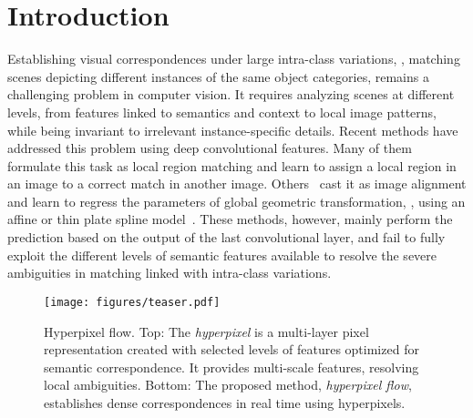 \documentclass[10pt,twocolumn,letterpaper]{article}
\begin{document}
\section{Introduction}
Establishing visual correspondences under large intra-class variations, \ie, matching scenes depicting different instances of the same object categories, remains a challenging problem in computer vision. It requires analyzing scenes at different levels, from features linked to semantics and context to local image patterns, while being invariant to irrelevant instance-specific details.
Recent methods have addressed this problem using deep convolutional features. 
Many of them~\cite{choy2016universal,han2017scnet,kim2017fcss,Rocco18} formulate this task as local region matching and learn to assign a local region in an image to a correct match in another image. Others~\cite{NIPS2018_7851, Rocco17, Rocco18, paul2018attentive} cast it as image alignment and learn to regress the parameters of global geometric transformation, \eg, using an affine or thin plate spline model~\cite{donato2002approximate}. These methods, however, mainly perform the prediction based on the output of the last convolutional layer, and fail to fully exploit the different levels of semantic features available to resolve the severe ambiguities in matching linked with intra-class variations.  


\begin{figure}[t]
	
    \centering
    \texttt{[image: figures/teaser.pdf]}
	\vspace{-3.0mm}
		
	\caption{Hyperpixel flow. {Top:} The {\em hyperpixel} is a multi-layer pixel representation created with selected levels of features optimized for semantic correspondence. It provides multi-scale features, resolving local ambiguities. {Bottom:} The proposed method, {\em hyperpixel flow}, establishes dense correspondences in real time using hyperpixels. } \label{fig:teaser}
	\vspace{-3.0mm}
\end{figure}
\end{document}
